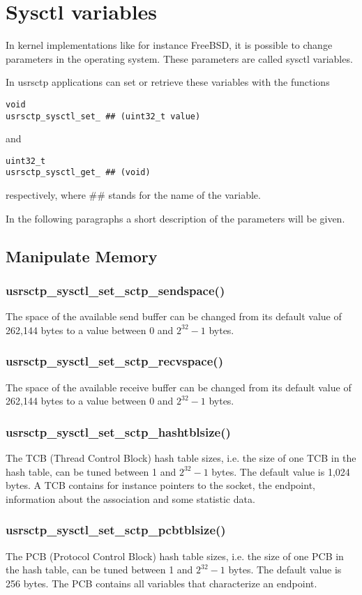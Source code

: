 \documentclass[a4paper]{article}
\begin{document}
\section{Sysctl variables}

In kernel implementations like for instance FreeBSD, it is possible to change parameters
in the operating system. These parameters are called sysctl variables.

In usrsctp applications can set or retrieve these variables with the functions
\begin{verbatim}
void
usrsctp_sysctl_set_ ## (uint32_t value)
\end{verbatim}
and
\begin{verbatim}
uint32_t
usrsctp_sysctl_get_ ## (void)
\end{verbatim}
respectively, where \#\# stands for the name of the variable.

In the following paragraphs a short description of the parameters will be given.

\subsection{Manipulate Memory}
\subsubsection{usrsctp\_sysctl\_set\_sctp\_sendspace()}
The space of the available send buffer can be changed from its default value of 262,144 bytes
to a value between 0 and $2^{32}-1$ bytes.

\subsubsection{usrsctp\_sysctl\_set\_sctp\_recvspace()}
The space of the available receive buffer can be changed from its default value of 262,144 bytes
to a value between 0 and $2^{32}-1$ bytes.

\subsubsection{usrsctp\_sysctl\_set\_sctp\_hashtblsize()}
The TCB (Thread Control Block) hash table sizes, i.e. the size of one TCB in the hash table, can be tuned between 
1 and $2^{32}-1$ bytes. The default value is 1,024 bytes. A TCB contains for instance pointers to the socket, the
endpoint, information about the association and some statistic data.

\subsubsection{usrsctp\_sysctl\_set\_sctp\_pcbtblsize()}
The PCB (Protocol Control Block) hash table sizes, i.e. the size of one PCB in the hash table, can be tuned between 
1 and $2^{32}-1$ bytes. The default value is 256 bytes. The PCB contains all variables that characterize an endpoint.
\end{document}
